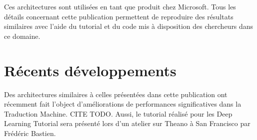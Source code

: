 Ces architectures sont utilisées en tant que produit chez Microsoft. Tous les
détails concernant cette publication permettent de reproduire des résultats
similaires avec l'aide du tutorial et du code mis à disposition des chercheurs
dans ce domaine. 


\section{R\'{e}cents d\'{e}veloppements}

Des architectures similaires à celles présentées dans cette publication ont
récemment fait l'object d'améliorations de performances significatives dans la
Traduction Machine. CITE TODO. Aussi, le tutorial réalisé pour les Deep
Learning Tutorial sera présenté lors d'un atelier sur Theano à San Francisco
par Frédéric Bastien. 



